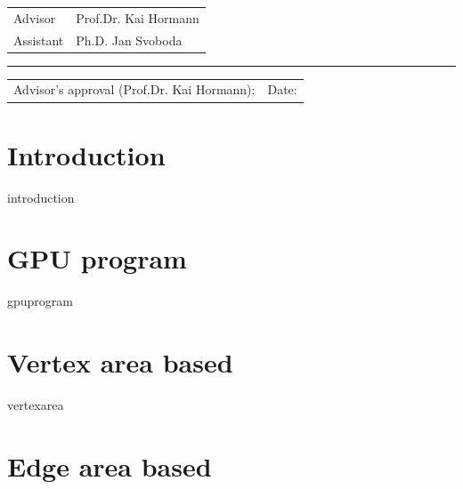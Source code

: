 \documentclass[12pt]{article}
\theoremstyle{definition}
\theoremstyle{definition}
\theoremstyle{plain}
\theoremstyle{plain}
\theoremstyle{plain}
\theoremstyle{plain}
\theoremstyle{definition}
\theoremstyle{remark}
\theoremstyle{remark}
\theoremstyle{remark}
\theoremstyle{remark}
\newcommand{\ADVISOR}{Prof.Dr. Kai Hormann}
\newcommand{\ASSISTANT}{Ph.D. Jan Svoboda}
\begin{document}
\begin{small}
  \begin{tabular}{@{}ll@{}}
    Advisor   & \ADVISOR   \\
    Assistant & \ASSISTANT
  \end{tabular}
\end{small}

\vspace{-.1cm}\rule{\textwidth}{0.4pt}

\begin{small}
  \begin{tabular}{@{} p{} l @{}}
    Advisor's approval (\ADVISOR): & Date:
  \end{tabular}
\end{small}



\newpage \tableofcontents

\newpage \section{Introduction}
{introduction}

\newpage \section{GPU program}
{gpuprogram}

\newpage \section{Vertex area based}
{vertexarea}

\newpage \section{Edge area based}
\color{red}{TODO: mean curvature! Fix bug and implement new version}
\color{black}

\end{document}
